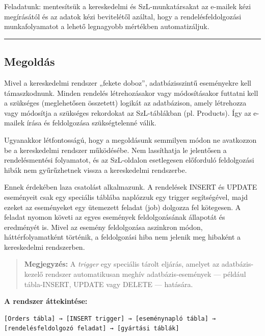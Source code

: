 \documentclass[
  magyar,
]{article}
\begin{document}
Feladatunk: mentesítsük a kereskedelmi és SzL-munkatársakat az e-mailek
kézi megírásától és az adatok kézi bevitelétől azáltal, hogy a
rendelésfeldolgozási munkafolyamatot a lehető legnagyobb mértékben
automatizáljuk.

\begin{center}\rule{0.5\linewidth}{0.5pt}\end{center}

\subsection{Megoldás}\label{megolduxe1s}

Mivel a kereskedelmi rendszer „fekete doboz'', adatbázisszintű
eseményekre kell támaszkodnunk. Minden rendelés létrehozásakor vagy
módosításakor futtatni kell a szükséges (meglehetősen összetett) logikát
az adatbázison, amely létrehozza vagy módosítja a szükséges rekordokat
az SzL-táblákban (pl. Products). Így az e-mailek írása és feldolgozása
szükségtelenné válik.

Ugyanakkor létfontosságú, hogy a megoldásunk semmilyen módon ne
avatkozzon be a kereskedelmi rendszer működésébe. Nem lassíthatja le
jelentősen a rendelésmentési folyamatot, és az SzL-oldalon esetlegesen
előforduló feldolgozási hibák nem gyűrűzhetnek vissza a kereskedelmi
rendszerbe.

Ennek érdekében laza csatolást alkalmazunk. A rendelések INSERT és
UPDATE eseményeit csak egy speciális táblába naplózzuk egy trigger
segítségével, majd ezeket az eseményeket egy ütemezett feladat (job)
dolgozza fel kötegesen. A feladat nyomon követi az egyes események
feldolgozásának állapotát és eredményét is. Mivel az esemény
feldolgozása aszinkron módon, háttérfolyamatként történik, a
feldolgozási hiba nem jelenik meg hibaként a kereskedelmi rendszerben.

\begin{quote}
\textbf{Megjegyzés:} A \emph{trigger} egy speciális tárolt eljárás,
amelyet az adatbázis-kezelő rendszer automatikusan meghív
adatbázis-események --- például tábla-INSERT, UPDATE vagy DELETE ---
hatására.
\end{quote}

\textbf{A rendszer áttekintése:}

\begin{verbatim}
[Orders tábla] → [INSERT trigger] → [eseménynapló tábla] → [rendelésfeldolgozó feladat] → [gyártási táblák]
\end{verbatim}
\end{document}
